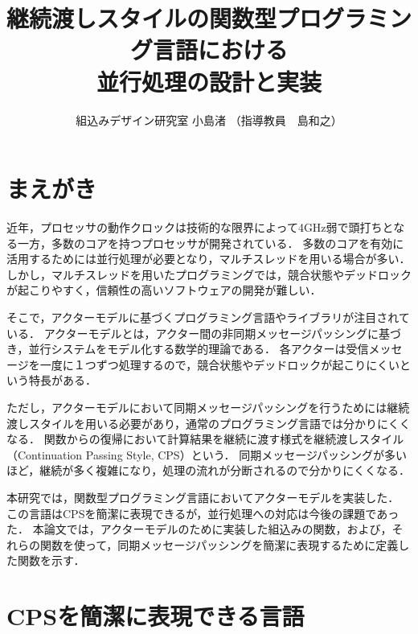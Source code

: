 \documentclass[10pt,a4j,twocolumn,oneside]{jsarticle}
\title{
{\bf 継続渡しスタイルの関数型プログラミング言語における \\ 並行処理の設計と実装}
}
\author{組込みデザイン研究室  小島渚 \quad （指導教員　島和之）}
\date{}
\begin{document}
\maketitle
\thispagestyle{empty}

\section{まえがき}

近年，プロセッサの動作クロックは技術的な限界によって4GHz弱で頭打ちとなる一方，多数のコアを持つプロセッサが開発されている．
多数のコアを有効に活用するためには並行処理が必要となり，マルチスレッドを用いる場合が多い．
しかし，マルチスレッドを用いたプログラミングでは，競合状態やデッドロックが起こりやすく，信頼性の高いソフトウェアの開発が難しい．

そこで，アクターモデルに基づくプログラミング言語やライブラリが注目されている．
アクターモデルとは，アクター間の非同期メッセージパッシングに基づき，並行システムをモデル化する数学的理論である\cite{Hewitt1974, Hewitt2010, Agha1986}．
各アクターは受信メッセージを一度に１つずつ処理するので，競合状態やデッドロックが起こりにくいという特長がある．

ただし，アクターモデルにおいて同期メッセージパッシングを行うためには継続渡しスタイルを用いる必要があり，通常のプログラミング言語では分かりにくくなる．
関数からの復帰において計算結果を継続に渡す様式を継続渡しスタイル（Continuation Passing Style, CPS）という\cite{Sussman1998, Reynolds1993}．
同期メッセージパッシングが多いほど，継続が多く複雑になり，処理の流れが分断されるので分かりにくくなる．

本研究では，関数型プログラミング言語\cite{Shima201612}においてアクターモデルを実装した\cite{Kojima201709,Kojima201801}．
この言語はCPSを簡潔に表現できるが，並行処理への対応は今後の課題であった．
本論文では，アクターモデルのために実装した組込みの関数，および，それらの関数を使って，同期メッセージパッシングを簡潔に表現するために定義した関数を示す．

\section{CPSを簡潔に表現できる言語}
\end{document}

